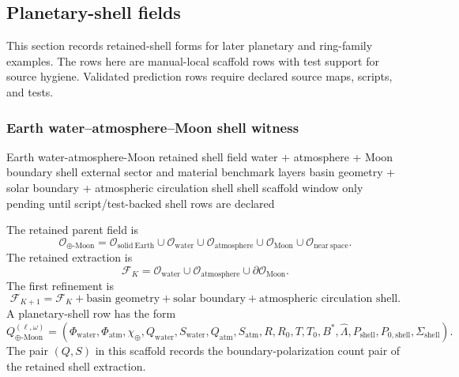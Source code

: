 \subsection{Planetary-shell fields}
\label{man:planetary-shell-fields}

This section records retained-shell forms for later planetary and ring-family examples. The rows here are manual-local scaffold rows with test support for source hygiene. Validated prediction rows require declared source maps, scripts, and tests.

\subsubsection{Earth water--atmosphere--Moon shell witness}
\label{man:earth-water-atmosphere-moon-shell-witness}

\RetentionBlock
{Earth water-atmosphere-Moon retained shell field}
{water + atmosphere + Moon boundary shell}
{external sector and material benchmark layers}
{basin geometry + solar boundary + atmospheric circulation shell}
{shell scaffold window only}
{pending until script/test-backed shell rows are declared}

The retained parent field is
\[
\mathcal O_{\oplus\text{-Moon}}=
\mathcal O_{\mathrm{solid\ Earth}}
\cup
\mathcal O_{\mathrm{water}}
\cup
\mathcal O_{\mathrm{atmosphere}}
\cup
\mathcal O_{\mathrm{Moon}}
\cup
\mathcal O_{\mathrm{near\ space}}.
\]
The retained extraction is
\[
\mathcal F_K=
\mathcal O_{\mathrm{water}}
\cup
\mathcal O_{\mathrm{atmosphere}}
\cup
\partial\mathcal O_{\mathrm{Moon}}.
\]
The first refinement is
\[
\mathcal F_{K+1}=\mathcal F_K+
\text{basin geometry}+
\text{solar boundary}+
\text{atmospheric circulation shell}.
\]
A planetary-shell row has the form
\[
Q_{\oplus\text{-Moon}}^{(\ell,\omega)}=
(\Phi_{\mathrm{water}},\Phi_{\mathrm{atm}},\chi_{\oplus},
Q_{\mathrm{water}},S_{\mathrm{water}},
Q_{\mathrm{atm}},S_{\mathrm{atm}},
R,R_0,T,T_0,B^*,\widehat\Lambda,
P_{\mathrm{shell}},P_{0,\mathrm{shell}},\Sigma_{\mathrm{shell}}).
\]
The pair \((Q,S)\) in this scaffold records the boundary-polarization count pair of the retained shell extraction.

